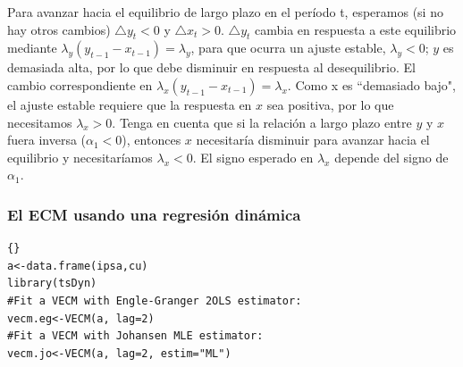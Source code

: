 	

	
	
	Para avanzar hacia el equilibrio de largo plazo en el período t, esperamos (si no hay otros cambios) $\triangle y_t < 0$ y $\triangle x_t > 0$. $\triangle y_t$ cambia en respuesta a este equilibrio mediante $\lambda_y (y_{t-1} - x_{t-1}) = \lambda_y$, para que ocurra un ajuste estable, $\lambda_y < 0$; $y$ es demasiada alta, por lo que debe disminuir en respuesta al desequilibrio. El cambio correspondiente en $\lambda_x (y_{t-1} - x_{t-1}) = \lambda_x$. Como x es ``demasiado bajo", el ajuste estable requiere que la respuesta en $x$ sea positiva, por lo que necesitamos $\lambda_x > 0$. Tenga en cuenta que si la relaci\'on a largo plazo entre $y$ y $x$ fuera inversa ($\alpha_1 < 0$), entonces $x$ necesitar\'{i}a disminuir para avanzar hacia el equilibrio y necesitaríamos $\lambda_x < 0$. El signo esperado en $\lambda_x$ depende del signo de $\alpha_1$.
	

	
\subsubsection{El ECM usando una regresi\'on din\'amica}
	\vspace{4mm}	
	
%			
%			
%			
%	
\begin{lstlisting}[title={‘Código R: Cointegration in practice,  Ejemplo Modelo IPSA - CU - S$\&$P},basicstyle=\ttfamily]{}
a<-data.frame(ipsa,cu)
library(tsDyn)
#Fit a VECM with Engle-Granger 2OLS estimator:
vecm.eg<-VECM(a, lag=2)
#Fit a VECM with Johansen MLE estimator:
vecm.jo<-VECM(a, lag=2, estim="ML")
\end{lstlisting}

